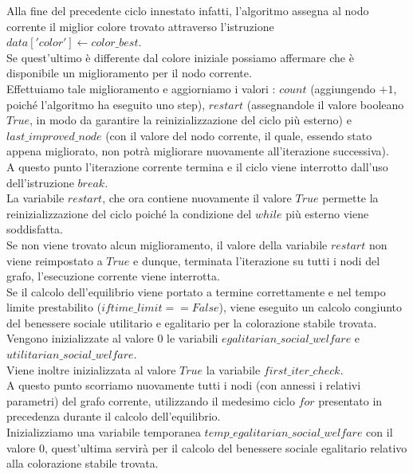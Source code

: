 Alla fine del precedente ciclo innestato infatti, l'algoritmo assegna al nodo corrente il miglior colore trovato attraverso l'istruzione $data['color']\gets color\_best$.\\
Se quest'ultimo è differente dal colore iniziale possiamo affermare che è disponibile un miglioramento per il nodo corrente.\\
Effettuiamo tale miglioramento e aggiorniamo i valori : $count$ (aggiungendo $+1$, poiché l'algoritmo ha eseguito uno step), $restart$ (assegnandole il valore booleano $True$, in modo da garantire la reinizializzazione del ciclo più esterno) e $ last\_improved\_node$ (con il valore del nodo corrente, il quale, essendo stato appena migliorato, non potrà migliorare nuovamente all'iterazione successiva).\\
A questo punto l'iterazione corrente termina e il ciclo viene interrotto dall'uso dell'istruzione $break$.\\
La variabile $restart$, che ora contiene nuovamente il valore $True$ permette la reinizializzazione del ciclo poiché la condizione del $while$ più esterno viene soddisfatta.\\
Se non viene trovato alcun miglioramento, il valore della variabile $restart$ non viene reimpostato a $True$ e dunque, terminata l'iterazione su tutti i nodi del grafo, l'esecuzione corrente viene interrotta.\\

Se il calcolo dell'equilibrio viene portato a termine correttamente e nel tempo limite prestabilito ($if time\_limit == False$), viene eseguito un calcolo congiunto del benessere sociale utilitario e egalitario per la colorazione stabile trovata.\\

Vengono inizializzate al valore $0$ le variabili $egalitarian\_social\_welfare$ e $utilitarian\_social\_welfare$.\\
Viene inoltre inizializzata al valore $True$ la variabile $first\_iter\_check$.\\

A questo punto scorriamo nuovamente tutti i nodi (con annessi i relativi parametri) del grafo corrente, utilizzando il medesimo ciclo $for$ presentato in precedenza durante il calcolo dell'equilibrio.\\
Inizializziamo una variabile temporanea $temp\_egalitarian\_social\_welfare$ con il valore $0$, quest'ultima servirà per il calcolo del benessere sociale egalitario relativo alla colorazione stabile trovata.\\

